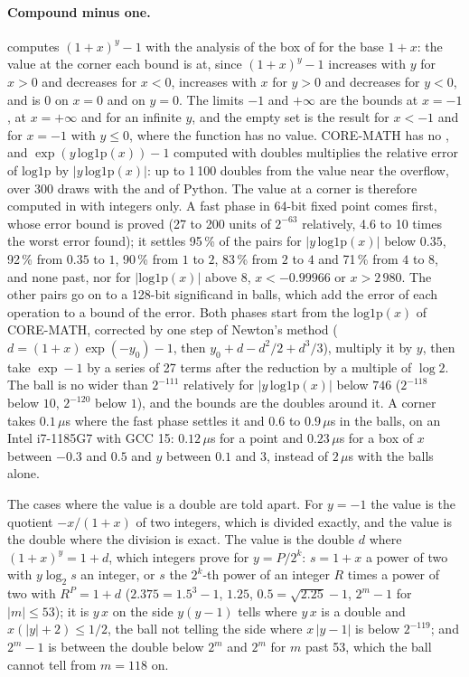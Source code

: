 \documentclass[12pt,a4paper,twoside,openright]{book}
\begin{document}
\paragraph{Compound minus one.}%
 computes $(1+x)^y-1$ with the analysis of the box
of  for the base $1+x$: the value at the corner each bound is
at, since $(1+x)^y-1$ increases with $y$ for $x>0$ and decreases for
$x<0$, increases with $x$ for $y>0$ and decreases for $y<0$, and is $0$ on
$x=0$ and on $y=0$. The limits $-1$ and $+\infty$ are the bounds at
$x=-1$, at $x=+\infty$ and for an infinite $y$, and the empty set is the
result for $x<-1$ and for $x=-1$ with $y\leq0$, where the function has no
value. CORE-MATH has no , and
$\exp(y\,\mathrm{log1p}(x))-1$ computed with doubles multiplies the
relative error of $\mathrm{log1p}$ by $|y\,\mathrm{log1p}(x)|$: up to
1\,100 doubles from the value near the overflow, over 300 draws with the
 and  of Python. The value at a corner is
therefore computed in  with integers
only. A fast phase in 64-bit fixed point comes first, whose error bound is
proved (27 to 200 units of $2^{-63}$ relatively, 4.6 to 10 times the worst
error found); it settles 95\,\% of the pairs for $|y\,\mathrm{log1p}(x)|$
below $0.35$, 92\,\% from $0.35$ to $1$, 90\,\% from $1$ to $2$, 83\,\%
from $2$ to $4$ and 71\,\% from $4$ to $8$, and none past, nor for
$|\mathrm{log1p}(x)|$ above $8$, $x<-0.99966$ or $x>2\,980$. The other
pairs go on to a 128-bit significand in balls, which add the error of each
operation to a bound of the error. Both phases start from the
$\mathrm{log1p}(x)$ of CORE-MATH, corrected by one step of Newton's method
($d=(1+x)\exp(-y_0)-1$, then $y_0+d-d^2/2+d^3/3$), multiply it by $y$,
then take $\exp-1$ by a series of 27 terms after the reduction by a
multiple of $\log2$. The ball is no wider than $2^{-111}$ relatively for
$|y\,\mathrm{log1p}(x)|$ below $746$ ($2^{-118}$ below $10$, $2^{-120}$
below $1$), and the bounds are the doubles around it. A corner takes
$0.1\,\mu$s where the fast phase settles it and $0.6$ to $0.9\,\mu$s in
the balls, on an Intel i7-1185G7 with GCC 15: $0.12\,\mu$s for a point and
$0.23\,\mu$s for a box of $x$ between $-0.3$ and $0.5$ and $y$ between
$0.1$ and $3$, instead of $2\,\mu$s with the balls alone.

The cases where the value is a double are told apart. For $y=-1$ the value
is the quotient $-x/(1+x)$ of two integers, which is divided exactly, and
the value is the double where the division is exact. The value is the
double $d$ where $(1+x)^y=1+d$, which integers prove for $y=P/2^k$:
$s=1+x$ a power of two with $y\log_2 s$ an integer, or $s$ the $2^k$-th
power of an integer $R$ times a power of two with $R^P=1+d$
($2.375=1.5^3-1$, $1.25$, $0.5=\sqrt{2.25}-1$, $2^m-1$ for $|m|\leq53$);
it is $y\,x$ on the side $y(y-1)$ tells where $y\,x$ is a double and
$x(|y|+2)\leq1/2$, the ball not telling the side where $x\,|y-1|$ is below
$2^{-119}$; and $2^m-1$ is between the double below $2^m$ and $2^m$ for
$m$ past 53, which the ball cannot tell from $m=118$ on.\newinvfive
\end{document}
